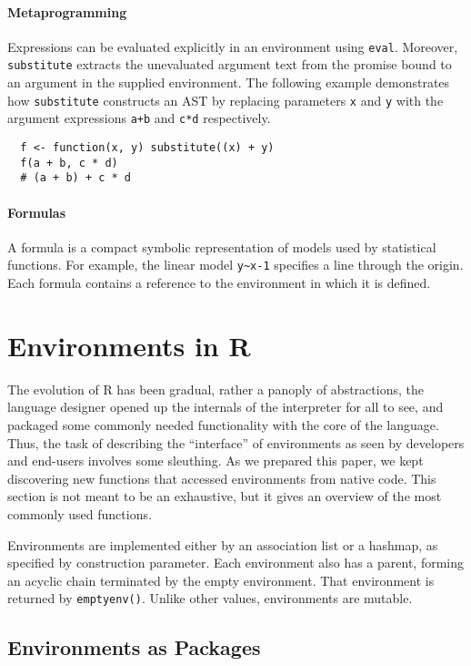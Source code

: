 \documentclass[10pt,sigplan,authorversion=true]{acmart}
\renewcommand{\c}[1]{\lstinline |#1|\xspace}
\newcommand{\eval}{\c{eval}}
\newcommand{\substitute}{\c{substitute}}
\begin{document}
\paragraph{Metaprogramming}

Expressions can be evaluated explicitly in an
environment using \eval. Moreover, \substitute extracts the unevaluated argument
text from the promise bound to an argument in the supplied environment. The
following example demonstrates how \substitute constructs an AST by replacing
parameters \c{x} and \c{y} with the argument expressions \c{a+b} and \c{c*d}
respectively.


\begin{lstlisting}
  f <- function(x, y) substitute((x) + y)
  f(a + b, c * d)
  # (a + b) + c * d
\end{lstlisting}


\paragraph{Formulas}  A formula is a compact symbolic representation of models
used by statistical functions. For example, the linear model \c{y~x-1}
specifies a line through the origin. Each formula contains a reference to the
environment in which it is defined.

\newpage
\section{Environments in R}

The evolution of R has been gradual, rather a panoply of abstractions, the
language designer opened up the internals of the interpreter for all to see, and
packaged some commonly needed functionality with the core of the language. Thus,
the task of describing the ``interface'' of environments as seen by developers
and end-users involves some sleuthing. As we prepared this paper, we kept
discovering new functions that accessed environments from native code. This
section is not meant to be an exhaustive, but it gives an overview of the most
commonly used functions.

Environments are implemented either by an association list or a hashmap, as
specified by construction parameter. Each environment also has a parent, forming
an acyclic chain terminated by the empty environment. That environment is
returned by \c{emptyenv()}. Unlike other values, environments are mutable.

\subsection{Environments as Packages}
\end{document}
